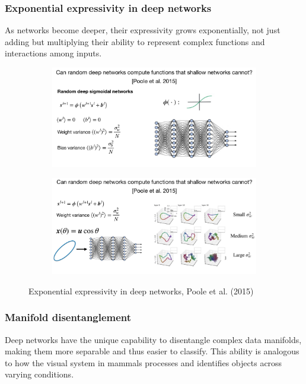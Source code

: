\documentclass[11pt]{book} %
\begin{document}
\subsubsection{Exponential expressivity in deep networks}
As networks become deeper, their expressivity grows exponentially, not just adding but multiplying their ability to represent complex functions and interactions among inputs.

\begin{figure}[ht]
    \begin{subfigure}[b]{0.8\textwidth}
        \centering
        \includegraphics[width=\textwidth]{./Figs/expressivity1.jpeg}
        \label{fig:exponential_expressivity}
    \end{subfigure}
    \hfill
    \begin{subfigure}[b]{0.8\textwidth}
        \centering
        \includegraphics[width=\textwidth]{./Figs/expressivity2.jpeg}
        \label{fig:exponential_expressivity2}
    \end{subfigure}
    \caption{Exponential expressivity in deep networks, Poole et al. (2015)}
\end{figure}

\subsubsection{Manifold disentanglement}
Deep networks have the unique capability to disentangle complex data manifolds, making them more separable and thus easier to classify.
This ability is analogous to how the visual system in mammals processes and identifies objects across varying conditions.
\end{document}
